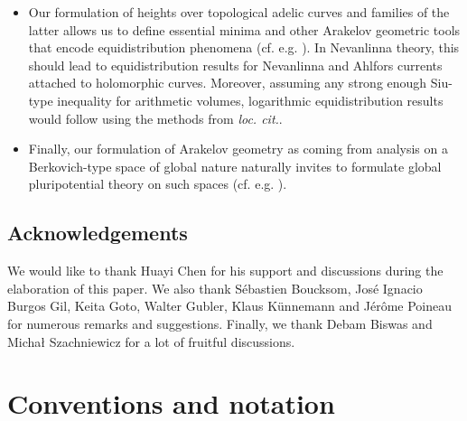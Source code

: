 \documentclass [11pt,reqno]{amsart}
\newcommand{\1}{\mathmybb{1}}
\begin{document}
\begin{itemize}
	\item Our formulation of heights over topological adelic curves and families of the latter allows us to define essential minima and other Arakelov geometric tools that encode equidistribution phenomena (cf. e.g. \cite{BallaySombra24}). In Nevanlinna theory, this should lead to equidistribution results for Nevanlinna and Ahlfors currents attached to holomorphic curves. Moreover, assuming any strong enough Siu-type inequality for arithmetic volumes, logarithmic equidistribution results would follow using the methods from \emph{loc. cit.}.
	\item Finally, our formulation of Arakelov geometry as coming from analysis on a Berkovich-type space of global nature naturally invites to formulate global pluripotential theory on such spaces (cf. e.g. \cite{Morrow25}). 
\end{itemize}

\subsection*{Acknowledgements}

We would like to thank Huayi Chen for his support and discussions during the elaboration of this paper. We also thank Sébastien Boucksom, José Ignacio Burgos Gil, Keita Goto, Walter Gubler, Klaus Künnemann and Jérôme Poineau for numerous remarks and suggestions. Finally, we thank Debam Biswas and Micha\l{} Szachniewicz for a lot of fruitful discussions. 

\section*{Conventions and notation}
\end{document}
